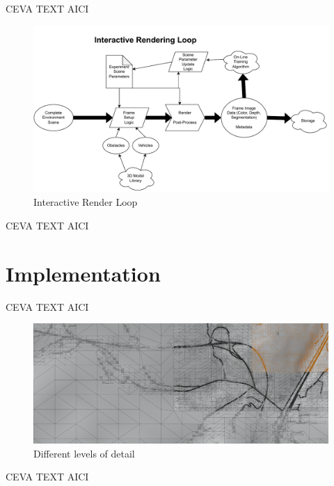 CEVA TEXT AICI

\begin{figure}[H]
    \centering
    \includegraphics[width=14.5cm]{src/img/fig/fig-5 interactive render loop.drawio.pdf}
    \caption{Interactive Render Loop}
    \label{fig:design-render-interactive}
\end{figure}


CEVA TEXT AICI



\section{Implementation}
\label{sec:implementation}


CEVA TEXT AICI

\begin{figure}[H]
    \centering
    \includegraphics[width=14.5cm]{src/img/pic/pic-1 blender screenshot sat levels of detail.png}
    \caption{Different levels of detail }
    \label{fig:design-render-interactive}
\end{figure}


CEVA TEXT AICI

